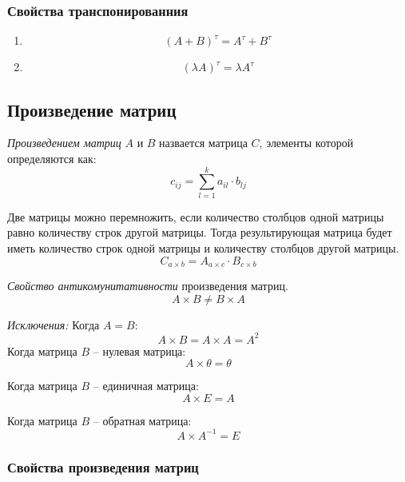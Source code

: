 \subsubsection{Свойства транспонированния}

\begin{enumerate}
  \item \[
      (A + B)^\tau = A^\tau + B^\tau
  \] 

  \item \[
    (\lambda A)^\tau = \lambda A^\tau
\] 
\end{enumerate}

\subsection{Произведение матриц}

\begin{definition}
  \textit{Произведением матриц} $A$ и $B$ назвается матрица $C$, элементы которой определяются как: \[
    c_{ij} = \sum_{l=1}^{k} a_{il} \cdot b_{lj}
  \] 
\end{definition}

\begin{note}
  Две матрицы можно перемножить, если количество столбцов одной матрицы равно количеству строк другой матрицы. Тогда результирующая матрица будет иметь количество строк одной матрицы и количеству столбцов другой матрицы. \[
    C_{a \times b} = A_{a \times c} \cdot B_{c \times b}
  \] 
\end{note}

\textit{Свойство антикомунитативности} произведения матриц. 
\[
  A \times B \neq B \times A
\]

\begin{note}
  \textit{Исключения:} 
  Когда $A = B$:  \[
  
    A \times B = A \times A = A^2
  \]  
  Когда матрица $B$ -- нулевая матрица:
  \[
    A \times \theta = \theta
  \] 

  Когда матрица  $B$ -- единичная матрица:
  \[
    A \times E = A
  \] 

  Когда матрица $B$ -- обратная матрица:
  \[
    A \times A^{-1} = E
  \] 
\end{note}

\subsubsection{Свойства произведения матриц}


